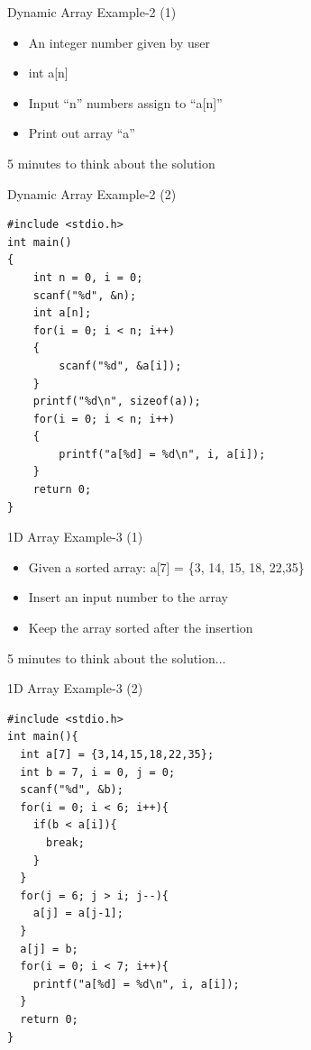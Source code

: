 \begin{frame}{Dynamic Array Example-2 (1)}
	\begin{itemize}
		\item {An integer number given by user}
		\item {int a[n]}
		\item {Input ``n'' numbers assign to ``a[n]''}
		\item {Print out array ``a''}
	\end{itemize}
	\vspace{0.2in}
	\begin{center}
		\Large{5 minutes to think about the solution}
	\end{center}
\end{frame}

\begin{frame}[fragile]{Dynamic Array Example-2 (2)}
\begin{lstlisting}
#include <stdio.h>
int main()
{
	int n = 0, i = 0;
	scanf("%d", &n);
	int a[n];
	for(i = 0; i < n; i++)
	{
		scanf("%d", &a[i]);
	}
	printf("%d\n", sizeof(a));
	for(i = 0; i < n; i++)
	{
		printf("a[%d] = %d\n", i, a[i]);
	}	
	return 0;
}
\end{lstlisting}

\end{frame}

\begin{frame}{1D Array Example-3 (1)}
	\begin{itemize}
		\item {Given a sorted array: a[7] = \{3, 14, 15, 18, 22,35\}}
		\item {Insert an input number to the array}
		\item {Keep the array sorted after the insertion}
	\end{itemize}
	\vspace{0.2in}
	\begin{center}
		\Large{5 minutes to think about the solution...}
	\end{center}
\end{frame}

\begin{frame}[fragile]{1D Array Example-3 (2)}
\begin{lstlisting}[xleftmargin=0.05\linewidth, linewidth=0.8\linewidth]
#include <stdio.h> 
int main(){
  int a[7] = {3,14,15,18,22,35};
  int b = 7, i = 0, j = 0;
  scanf("%d", &b);
  for(i = 0; i < 6; i++){
    if(b < a[i]){
      break;
	}
  }
  for(j = 6; j > i; j--){
    a[j] = a[j-1];
  }
  a[j] = b;
  for(i = 0; i < 7; i++){
	printf("a[%d] = %d\n", i, a[i]);
  }
  return 0;
}
\end{lstlisting}
\end{frame}

